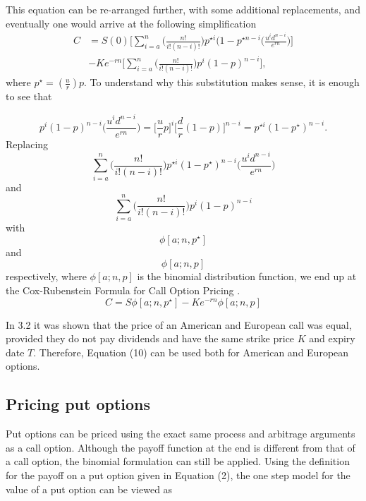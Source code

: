 \documentclass[letterpaper,12pt]{article}
\theoremstyle{plain}
\numberwithin{equation}{section}
\begin{document}
This equation can be re-arranged further, with some additional replacements, and eventually one would arrive at the following simplification
\begin{equation*}
\begin{aligned}
	C & = S(0)\Bigg[ \sum_{i=a}^{n} \bigg(  \frac{n!}{i!(n-i)!}\bigg)p^{\star i} (1-p^{\star n-i} \bigg(\frac{u^id^{n-i}}{e^{rn}}\bigg)\Bigg] \\
	&- Ke^{-rn}\Bigg[ \sum_{i=a}^{n} \bigg(  \frac{n!}{i!(n-i)!}\bigg)p^i (1-p)^{n-i} \Bigg], 
\end{aligned}
\end{equation*}
where $p^{\star} = (\frac{u}{r})p$. To understand why this substitution makes sense, it is enough to see that 

\begin{equation*}
	p^i (1-p)^{n-i} \bigg(\frac{u^i d^{n-i}}{e^{rn}}\bigg) = \bigg[ \frac{u}{r} p\bigg]^{i} \bigg[ \frac{d}{r}(1-p)\bigg]^{n-i} = p^{\star i} (1-p^{\star})^{n-i}.
\end{equation*}
Replacing
\begin{equation*}
	 \sum_{i=a}^{n} \bigg(  \frac{n!}{i!(n-i)!}\bigg)p^{\star i} (1-p^{\star})^{n-i} \bigg(\frac{u^id^{n-i}}{e^{rn}}\bigg)
\end{equation*}
and
\begin{equation*}
	 \sum_{i=a}^{n} \bigg(  \frac{n!}{i!(n-i)!}\bigg)p^i (1-p)^{n-i} 
\end{equation*}
with
\begin{equation*}
	\phi[a;n,p^{\star}]
\end{equation*}
and 
\begin{equation*}
	\phi[a;n,p]
\end{equation*}
respectively, where $\phi[a;n,p]$ is the binomial distribution function, we end up at the Cox-Rubenstein Formula for Call Option Pricing \cite{CRR}.
\begin{equation}
	C = S\phi[a;n,p^{\star}] - Ke^{-rn}\phi[a;n,p]
\end{equation}


In 3.2 it was shown that the price of an American and European call was equal, provided they do not pay dividends and have the same strike price $K$ and expiry date $T$. Therefore, Equation (10) can be used both for American and European options.

\subsection{Pricing put options}
Put options can be priced using the exact same process and arbitrage arguments as a call option. Although the payoff function at the end is different from that of a call option, the binomial formulation can still be applied. Using the definition for the payoff on a put option given in Equation (2), the one step model for the value of a put option can be viewed as 
\end{document}
